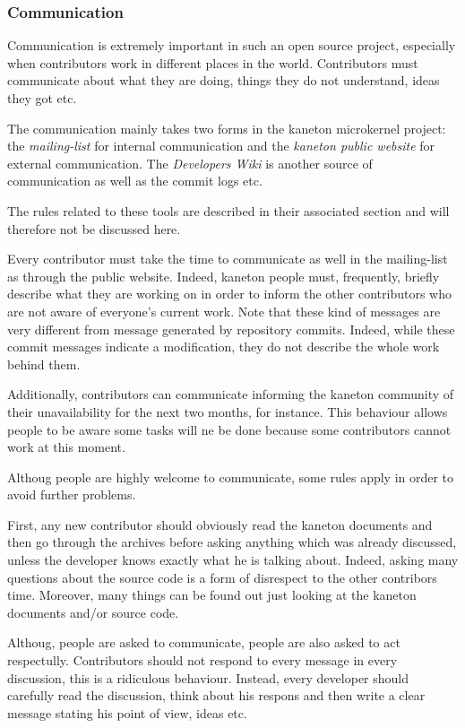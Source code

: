 
\subsubsection{Communication}

Communication is extremely important in such an open source project, especially
when contributors work in different places in the world. Contributors must
communicate about what they are doing, things they do not understand, ideas
they got etc.

The communication mainly takes two forms in the kaneton microkernel project:
the \textit{mailing-list} for internal communication and the \textit{kaneton
public website} for external communication. The \textit{Developers Wiki}
is another source of communication as well as the commit logs etc.

The rules related to these tools are described in their associated section
and will therefore not be discussed here.

Every contributor must take the time to communicate as well in the mailing-list
as through the public website. Indeed, kaneton people must, frequently,
briefly describe what they are working on in order to inform the other
contributors who are not aware of everyone's current work. Note that these
kind of messages are very different from message generated by repository
commits. Indeed, while these commit messages indicate a modification, they
do not describe the whole work behind them.

Additionally, contributors can communicate informing the kaneton community of
their unavailability for the next two months, for instance. This behaviour
allows people to be aware some tasks will ne be done because some contributors
cannot work at this moment.

Althoug people are highly welcome to communicate, some rules apply in order
to avoid further problems.

First, any new contributor should obviously read the kaneton documents and
then go through the archives before asking anything which was already
discussed, unless the developer knows exactly what he is talking about.
Indeed, asking many questions about the source code is a form of disrespect
to the other contribors time. Moreover, many things can be found out just
looking at the kaneton documents and/or source code.

Althoug, people are asked to communicate, people are also asked to act
respectully. Contributors should not respond to every message in every
discussion, this is a ridiculous behaviour. Instead, every developer should
carefully read the discussion, think about his respons and then write a clear
message stating his point of view, ideas etc.

